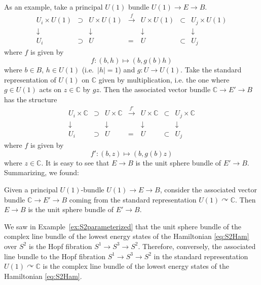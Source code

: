 \documentclass[12pt]{article}
\numberwithin{equation}{section}
\def\bC{\mathbb{C}}
\begin{document}
As an example, take a principal $U(1)$ bundle $U(1)\to E\to B$.
\begin{equation}
  \begin{array}{cccccccc}
    U_i \times U(1) &\supset& U \times U(1) & \xrightarrow{f } & 
    U \times U(1) & \subset & U_j\times U(1) \\
    \downarrow & & \downarrow & & \downarrow & & \downarrow \\
    U_i & \supset & U  & = & U  & \subset & U_j
  \end{array}
\end{equation}
where $f $ is given by \begin{equation}
   f : (b,h) \mapsto (b, g(b)h)
   \label{eq:U1-transition-function}
\end{equation} where $b\in B$, $h\in U(1)$ (i.e.~$|h|=1$) and $g: U\to U(1)$.
Take the standard representation of $U(1)$ on $\bC$ given by multiplication,
i.e. the one where $g\in U(1)$ acts on $z\in \bC$ by $gz$.
Then the associated vector bundle $\bC\to E'\to B$ has the structure 
\begin{equation}
  \begin{array}{cccccccc}
    U_i \times \bC &\supset& U \times \bC & \xrightarrow{f' } & 
    U \times \bC & \subset & U_j\times \bC \\
    \downarrow & & \downarrow & & \downarrow & & \downarrow \\
    U_i & \supset & U  & = & U  & \subset & U_j
  \end{array}
\end{equation}
where $f $ is given by \begin{equation}
   f' : (b,z) \mapsto (b, g(b)z)
   \label{eq:line-bundle-transition-function}
\end{equation} where $z\in \bC$.
It is easy to see that $E\to B$ is the unit sphere bundle of $E'\to B$.
Summarizing, we found:
\begin{proposition}
  Given a principal $U(1)$-bundle $U(1)\to E\to B$,
  consider the associated vector bundle $\bC\to E'\to B$
  coming from the standard representation $U(1)\curvearrowright \bC$.
  Then $E\to B$ is the unit sphere bundle of $E'\to B$.
\end{proposition}

We saw in Example~\ref{ex:S2parameterized} that the unit sphere bundle
of the complex line bundle of the lowest energy states of the Hamiltonian \eqref{eq:S2Ham}
over $S^2$ is the Hopf fibration $S^1\to S^3\to S^2$.
Therefore, conversely, the associated line bundle
to the Hopf fibration $S^1\to S^3\to S^2$ 
in the standard representation $U(1)\curvearrowright \bC$
is the complex line bundle of the lowest energy states of the Hamiltonian \eqref{eq:S2Ham}.
\end{document}
